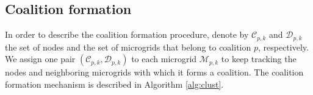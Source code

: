 \subsection{Coalition formation}
In order to describe the coalition formation procedure, denote by $\mathcal{C}_{p,k}$ and $\mathcal{D}_{p,k}$ the set of nodes and the set of microgrids that belong to coalition $p$, respectively. We  assign one pair $(\mathcal{C}_{p,k},\mathcal{D}_{p,k})$ to each microgrid $\mathcal{M}_{p,k}$ to keep tracking the nodes and neighboring microgrids with which it forms a coalition. The coalition formation mechanism is described in Algorithm \ref{alg:clust}. 
